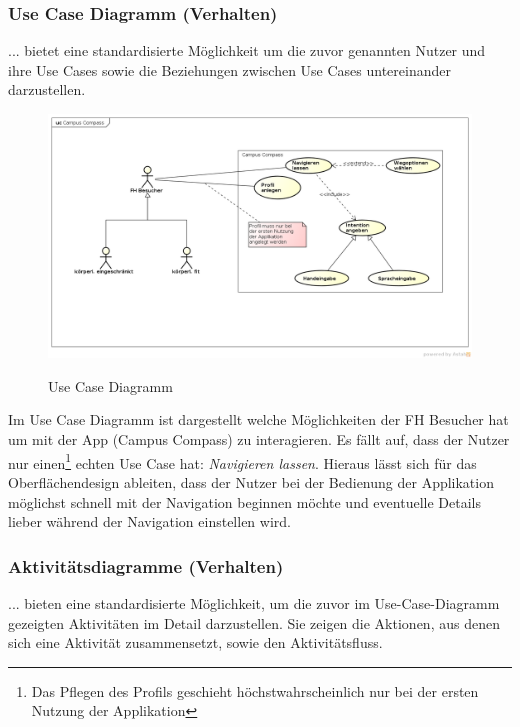 \subsubsection*{Use Case Diagramm (Verhalten)}
... bietet eine standardisierte Möglichkeit um die zuvor genannten Nutzer und ihre Use Cases sowie die Beziehungen zwischen Use Cases untereinander darzustellen.

\begin{figure}[hbt]
  \centering
  \includegraphics[width=\linewidth]{img/use-case-diagram.png}
  \label{img:use-case-diagramm}
  \caption{Use Case Diagramm}
\end{figure}

Im Use Case Diagramm ist dargestellt welche Möglichkeiten der FH Besucher hat um mit der App (Campus Compass) zu interagieren. Es fällt auf, dass der Nutzer nur einen\footnote{Das Pflegen des Profils geschieht höchstwahrscheinlich nur bei der ersten Nutzung der Applikation} echten Use Case hat: \emph{Navigieren lassen}. Hieraus lässt sich für das Oberflächendesign ableiten, dass der Nutzer bei der Bedienung der Applikation möglichst schnell mit der Navigation beginnen möchte und eventuelle Details lieber während der Navigation einstellen wird.

\newpage

\subsubsection*{Aktivitätsdiagramme (Verhalten)}
... bieten eine standardisierte Möglichkeit, um die zuvor im Use-Case-Diagramm gezeigten Aktivitäten im Detail darzustellen. Sie zeigen die Aktionen, aus denen sich eine Aktivität zusammensetzt, sowie den Aktivitätsfluss.

